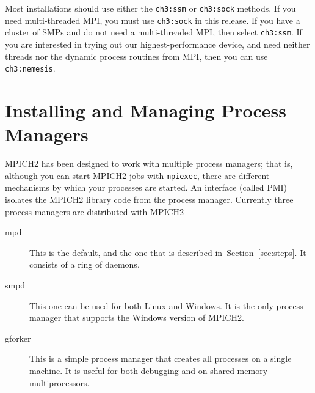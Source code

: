 \documentclass[dvipdfm,11pt]{article}
\begin{document}
Most installations should use either the \texttt{ch3:ssm} or \texttt{ch3:sock}
methods.  If you need multi-threaded MPI, you must use \texttt{ch3:sock} in
this release.  If you have a cluster of SMPs and do not need a multi-threaded
MPI, then select \texttt{ch3:ssm}.  If you are interested in trying out our
highest-performance device, and need neither threads nor the dynamic process
routines from MPI, then you can use \texttt{ch3:nemesis}.

%
%

\section{Installing and Managing Process Managers}
\label{sec:process-managers}
MPICH2 has been designed to work with multiple process managers; that
is, although you can start MPICH2 jobs with \texttt{mpiexec}, there are
different mechanisms by which your processes are started.  An interface
(called PMI) isolates the MPICH2 library code from the process manager.
Currently three process managers are distributed with MPICH2
\begin{description}
\item[mpd] This is the default, and the one that is described
  in~Section~\ref{sec:steps}.  It consists of a ring of daemons.
\item[smpd] This one can be used for both Linux and Windows.  It is the
  only process manager that supports the Windows version of MPICH2.
\item[gforker] This is a simple process manager that creates all
  processes on a single machine.  It is useful for both debugging and on
  shared memory multiprocessors.
\end{description}
\end{document}
